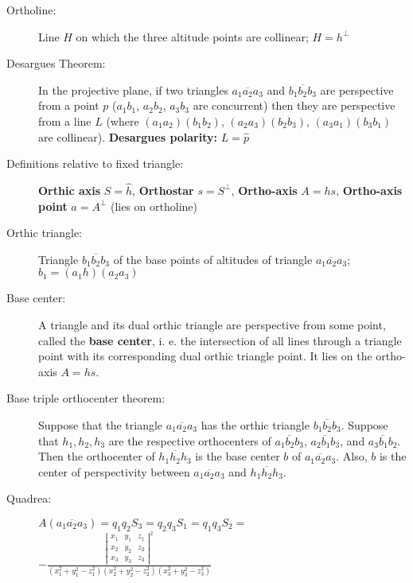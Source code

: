 \documentclass[DIV16,halfparskip]{scrartcl}
\begin{document}
\begin{description}
    \item [Ortholine:] Line $H$ on which the three altitude points are
        collinear; $H=h^\perp$

    \item [Desargues Theorem:] In the projective plane, if two triangles
        $\overline{a_1a_2a_3}$ and $\overline{b_1b_2b_3}$ are perspective from
        a point $p$ ($a_1b_1$, $a_2b_2$, $a_3b_3$ are concurrent) then they
        are perspective from a line $L$ (where $(a_1a_2)(b_1b_2)$,
        $(a_2a_3)(b_2b_3)$, $(a_3a_1)(b_3b_1)$ are collinear). \textbf{Desargues
        polarity:} $L = \hat{p}$

    \item [Definitions relative to fixed triangle:] \textbf{Orthic axis}
        $S=\hat{h}$, \textbf{Orthostar} $s=S^\perp$, \textbf{Ortho-axis}
        $A=hs$, \textbf{Ortho-axis point} $a=A^\perp$ (lies on ortholine)

    \item [Orthic triangle:] Triangle $\overline{b_1b_2b_3}$ of the base points
        of altitudes of triangle $\overline{a_1a_2a_3}$;
        $b_1=(a_1h)(a_2a_3)$

    \item [Base center:] A triangle and its dual orthic triangle are
        perspective from some point, called the \textbf{base center}, i. e. the
        intersection of all lines through a triangle point with its
        corresponding dual orthic triangle point. It lies on the ortho-axis $A=hs$.

    \item [Base triple orthocenter theorem:] Suppose that the triangle
        $\overline{a_1a_2a_3}$ has the orthic triangle $\overline{b_1b_2b_3}$.
        Suppose that $h_1, h_2, h_3$ are the respective orthocenters of
        $\overline{a_1b_2b_3}$, $\overline{a_2b_1b_3}$, and
        $\overline{a_3b_1b_2}$. Then the orthocenter of $\overline{h_1h_2h_3}$
        is the base center $b$ of $\overline{a_1a_2a_3}$. Also, $b$ is the
        center of perspectivity between $\overline{a_1a_2a_3}$ and
        $\overline{h_1h_2h_3}$.

    \item [Quadrea:] $A(\overline{a_1a_2a_3}) = q_1q_2S_3 = q_2q_3S_1 = q_1q_3S_2 = $\\
       $-\frac{\left|\begin{array}{ccc}x_1 & y_1 & z_1\\x_2 & y_2 & z_2 \\ x_3 & y_3 & z_3\end{array}\right|^2}
        {(x_1^2 + y_1^2 - z_1^2)(x_2^2 + y_2^2 - z_2^2)(x_3^2 + y_3^2 - z_3^2)}$


\end{description}
\end{document}
